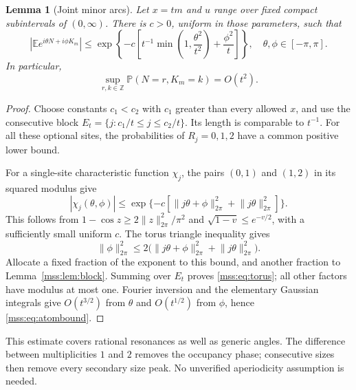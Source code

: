 \documentclass[11pt,letterpaper]{article}
\numberwithin{equation}{section}
\newtheorem{lemma}[theorem]{Lemma}
\theoremstyle{definition}\newtheorem{definition}[theorem]{Definition}
\theoremstyle{remark}\newtheorem{remark}[theorem]{Remark}
\newcommand{\E}{\mathbb E}
\newcommand{\Prob}{\mathbb P}
\newcommand{\Z}{\mathbb Z}
\newcommand{\normtor}[1]{\lVert #1\rVert_{2\pi}}
\begin{document}
\begin{lemma}[Joint minor arcs]\label{mss:lem:torus}
Let $x=tm$ and $u$ range over fixed compact subintervals of $(0,\infty)$. There is $c>0$, uniform in those parameters, such that
\begin{equation}\label{mss:eq:torus}
\left|\E e^{i\theta N+i\phi K_m}\right|
\le\exp\left\{-c\left[t^{-1}\min\left(1,\frac{\theta^2}{t^2}\right)
+\frac{\phi^2}{t}\right]\right\},\quad
\theta,\phi\in[-\pi,\pi].
\end{equation}
In particular,
\begin{equation}\label{mss:eq:atombound}
\sup_{r,k\in\Z}\Prob(N=r,K_m=k)=O(t^2).
\end{equation}
\end{lemma}
\begin{proof}
Choose constants $c_1<c_2$ with $c_1$ greater than every allowed $x$, and use the consecutive block $E_t=\{j:c_1/t\le j\le c_2/t\}$. Its length is comparable to $t^{-1}$. For all these optional sites, the probabilities of $R_j=0,1,2$ have a common positive lower bound.

For a single-site characteristic function $\chi_j$, the pairs $(0,1)$ and $(1,2)$ in its squared modulus give
\begin{equation}\label{mss:eq:singleFourier}
|\chi_j(\theta,\phi)|
\le\exp\{-c[\normtor{j\theta+\phi}^2+\normtor{j\theta}^2]\}.
\end{equation}
This follows from $1-\cos z\ge2\normtor{z}^2/\pi^2$ and $\sqrt{1-v}\le e^{-v/2}$, with a sufficiently small uniform $c$. The torus triangle inequality gives
\[
\normtor{\phi}^2\le
2\bigl(\normtor{j\theta+\phi}^2+\normtor{j\theta}^2\bigr).
\]
Allocate a fixed fraction of the exponent to this bound, and another fraction to Lemma~\ref{mss:lem:block}. Summing over $E_t$ proves \eqref{mss:eq:torus}; all other factors have modulus at most one. Fourier inversion and the elementary Gaussian integrals give $O(t^{3/2})$ from $\theta$ and $O(t^{1/2})$ from $\phi$, hence \eqref{mss:eq:atombound}.
\end{proof}
This estimate covers rational resonances as well as generic angles. The difference between multiplicities $1$ and $2$ removes the occupancy phase; consecutive sizes then remove every secondary size peak. No unverified aperiodicity assumption is needed.
\end{document}
